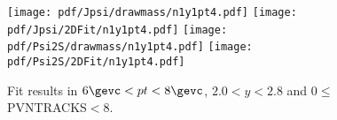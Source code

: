 \begin{figure}[H]
\begin{center}
\texttt{[image: pdf/Jpsi/drawmass/n1y1pt4.pdf]}
\texttt{[image: pdf/Jpsi/2DFit/n1y1pt4.pdf]}
\vspace*{-0.5cm}
\texttt{[image: pdf/Psi2S/drawmass/n1y1pt4.pdf]}
\texttt{[image: pdf/Psi2S/2DFit/n1y1pt4.pdf]}
\vspace*{-0.5cm}
\end{center}
\caption{Fit results in $6\gevc<pt<8\gevc$, $2.0<y<2.8$ and 0$\leq$PVNTRACKS$<$8.}
\label{Fitn1y1pt4}
\end{figure}
